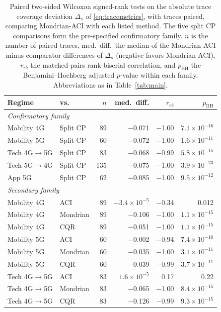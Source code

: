 \begin{table}[!t]
\caption{Paired two-sided Wilcoxon signed-rank tests on the absolute trace coverage deviation $\Delta_s$ of \eqref{eq:tracemetrics}, with traces paired, comparing Mondrian-ACI with each listed method. The five split CP comparisons form the pre-specified confirmatory family. $n$ is the number of paired traces, med.\ diff.\ the median of the Mondrian-ACI minus comparator differences of $\Delta_s$ (negative favors Mondrian-ACI), $r_{rb}$ the matched-pairs rank-biserial correlation, and $p_{\mathrm{BH}}$ the Benjamini--Hochberg adjusted $p$-value within each family. Abbreviations as in Table~\ref{tab:main}.}
\label{tab:tests}
\centering
\footnotesize
\begin{tabular}{llrrrr}
\toprule
Regime & vs. & $n$ & med.\ diff. & $r_{rb}$ & $p_{\mathrm{BH}}$ \\
\midrule
\multicolumn{6}{l}{\emph{Confirmatory family}} \\
Mobility 4G & Split CP & 89 & $-$0.071 & $-$1.00 & $7.1\times10^{-16}$ \\
Mobility 5G & Split CP & 60 & $-$0.072 & $-$1.00 & $1.6\times10^{-11}$ \\
Tech 4G$\rightarrow$5G & Split CP & 83 & $-$0.068 & $-$0.99 & $5.8\times10^{-15}$ \\
Tech 5G$\rightarrow$4G & Split CP & 135 & $-$0.075 & $-$1.00 & $3.9\times10^{-23}$ \\
App 5G & Split CP & 62 & $-$0.085 & $-$1.00 & $9.5\times10^{-12}$ \\
\midrule
\multicolumn{6}{l}{\emph{Secondary family}} \\
Mobility 4G & ACI & 89 & $-3.4\times10^{-5}$ & $-$0.34 & 0.012 \\
Mobility 4G & Mondrian & 89 & $-$0.106 & $-$1.00 & $1.1\times10^{-15}$ \\
Mobility 4G & CQR & 89 & $-$0.051 & $-$1.00 & $1.1\times10^{-15}$ \\
Mobility 5G & ACI & 60 & $-$0.002 & $-$0.94 & $7.4\times10^{-10}$ \\
Mobility 5G & Mondrian & 60 & $-$0.035 & $-$1.00 & $3.1\times10^{-11}$ \\
Mobility 5G & CQR & 60 & $-$0.039 & $-$0.99 & $3.7\times10^{-11}$ \\
Tech 4G$\rightarrow$5G & ACI & 83 & $1.6\times10^{-5}$ & 0.17 & 0.22 \\
Tech 4G$\rightarrow$5G & Mondrian & 83 & $-$0.065 & $-$1.00 & $8.4\times10^{-15}$ \\
Tech 4G$\rightarrow$5G & CQR & 83 & $-$0.126 & $-$0.99 & $9.3\times10^{-15}$ \\

\end{tabular}
\end{table}
